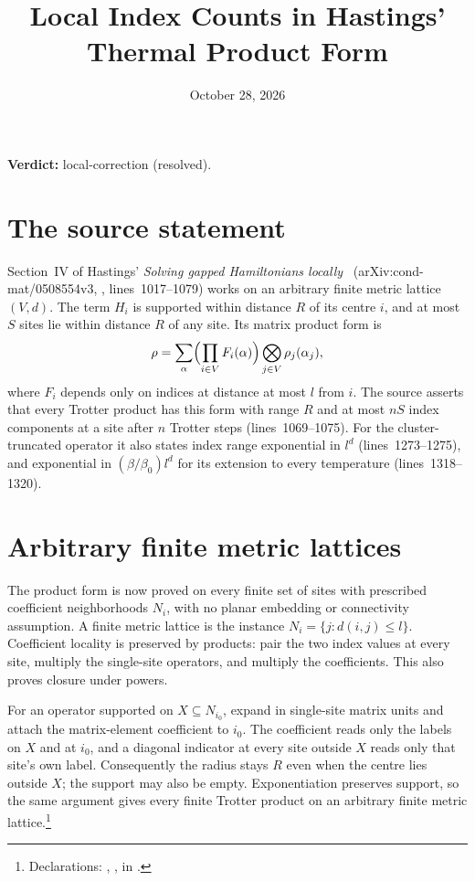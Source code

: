 \documentclass{article}
\title{Local Index Counts in Hastings' Thermal Product Form}
\author{}
\date{October 28, 2026}
\providecommand{\gapnote}[2]{\par\noindent\textbf{Verdict:} #1 (#2).\par}
\begin{document}
\maketitle
\gapnote{local-correction}{resolved}

\section{The source statement}

Section~IV of Hastings' \emph{Solving gapped Hamiltonians
locally}~\cite{Hastings2006Solving}
(arXiv:cond-mat/0508554v3, , lines~1017--1079)
works on an arbitrary finite metric lattice $(V,d)$. The term $H_i$ is
supported within distance $R$ of its centre $i$, and at most $S$ sites lie
within distance $R$ of any site. Its matrix product form is
\begin{align}
  \rho=\sum_{\alpha}\Bigl(\prod_{i\in V}F_i(\alpha)\Bigr)
          \bigotimes_{j\in V}\rho_j(\alpha_j),
  \label{eq:hastings05_product_metric_form}
\end{align}
where $F_i$ depends only on indices at distance at most $l$ from $i$.
The source asserts that every Trotter product has this form with range
$R$ and at most $nS$ index components at a site after $n$ Trotter steps
(lines~1069--1075). For the cluster-truncated operator it also states
index range exponential in $l^d$ (lines~1273--1275), and exponential in
$(\beta/\beta_0)l^d$ for its extension to every temperature
(lines~1318--1320).

\section{Arbitrary finite metric lattices}

The product form is now proved on every finite set of sites with prescribed
coefficient neighborhoods $N_i$, with no planar embedding or connectivity
assumption. A finite metric lattice is the instance
$N_i=\{j:d(i,j)\le l\}$. Coefficient locality is preserved by products:
pair the two index values at every site, multiply the single-site operators,
and multiply the coefficients. This also proves closure under powers.

For an operator supported on $X\subseteq N_{i_0}$, expand in single-site
matrix units and attach the matrix-element coefficient to $i_0$. The
coefficient reads only the labels on $X$ and at $i_0$, and a diagonal
indicator at every site outside $X$ reads only that site's own label.
Consequently the radius stays $R$ even when the centre lies outside $X$;
the support may also be empty. Exponentiation preserves support, so the
same argument gives every finite Trotter product on an arbitrary finite
metric lattice.\footnote{Declarations:
,
, in
.}
\end{document}
